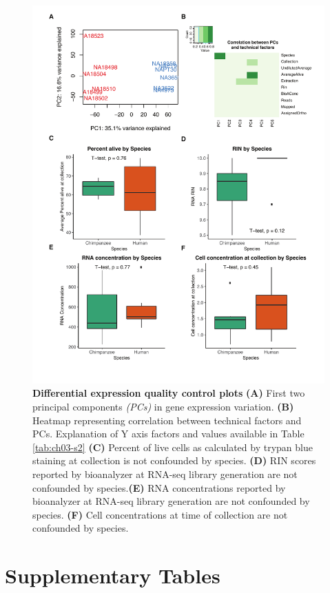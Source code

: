 \begin{figure}[!htb]
\centering
\includegraphics[width=5in]{img/ch03/Fig3_figSup4.pdf}
\caption[Differential expression quality control plots]{\textbf{Differential expression quality control plots} {\bf (A)} First two principal components \emph{(PCs)} in gene expression variation. {\bf (B)} Heatmap representing correlation between technical factors and PCs. Explanation of Y axis factors and values available in Table \ref{tab:ch03-s2} {\bf (C)} Percent of live cells as calculated by trypan blue staining at collection is not confounded by species. {\bf (D)}  RIN scores reported by bioanalyzer at RNA-seq library generation are not confounded by species.{\bf (E)}  RNA concentrations reported by bioanalyzer at RNA-seq library generation are not confounded by species. {\bf (F)}  Cell concentrations at time of collection are not confounded by species.}
\label{fig:ch03-DEQC}
\end{figure}
\clearpage


\clearpage
\section{Supplementary Tables}\label{ch03-supplementary-tables}

